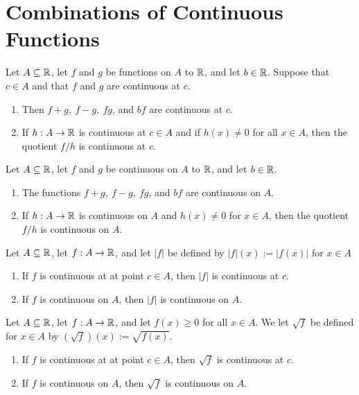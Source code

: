 \section{Combinations of Continuous Functions}

\begin{theorem}
	Let $A \subseteq \mathbb{R}$, let $f$ and $g$ be functions on $A$ to $\mathbb{R}$, and let $b \in \mathbb{R}$. Suppose that $c \in A$ and that $f$ and $g$ are continuous at $c$.
	\begin{enumerate}
		\item Then $f+g,\ f-g,\ fg$, and $bf$ are continuous at $c$.

		\item If $h:A \rightarrow \mathbb{R}$ is continuous at $c \in A$ and if $h(x) \neq 0$ for all $x \in A$, then the quotient $f/h$ is continuous at $c$.
	\end{enumerate}
\end{theorem}

\begin{theorem}
	Let $A \subseteq \mathbb{R}$, let $f$ and $g$ be continuous on $A$ to $\mathbb{R}$, and let $b \in \mathbb{R}$.
	\begin{enumerate}
		\item The functions $f+g,\ f-g,\ fg$, and $bf$ are continuous on $A$.

		\item If $h:A \rightarrow \mathbb{R}$ is continuous on $A$ and $h(x) \neq 0$ for $x \in A$, then the quotient $f/h$ is continuous on $A$.
	\end{enumerate}
\end{theorem}

\begin{theorem}
	Let $A \subseteq \mathbb{R}$, let $f:A \rightarrow \mathbb{R}$, and let $|f|$ be defined by $|f|(x) := |f(x)|$ for $x \in A$
	\begin{enumerate}
		\item If $f$ is continuous at at point $c \in A$, then $|f|$ is continuous at $c$.

		\item If $f$ is continuous on $A$, then $|f|$ is continuous on $A$.
	\end{enumerate}
\end{theorem}

\begin{theorem}
	Let $A \subseteq \mathbb{R}$, let $f:A \rightarrow \mathbb{R}$, and let $f(x) \geq 0$ for all $x \in A$. We let $\sqrt{f}$ be defined for $x \in A$ by $(\sqrt{f})(x) := \sqrt{f(x)}$.
	\begin{enumerate}
		\item If $f$ is continuous at at point $c \in A$, then $\sqrt{f}$ is continuous at $c$.

		\item If $f$ is continuous on $A$, then $\sqrt{f}$ is continuous on $A$.
	\end{enumerate}
\end{theorem}

